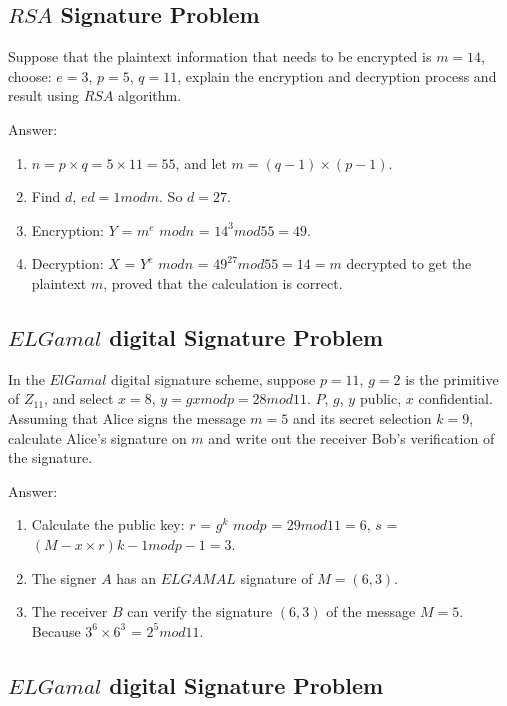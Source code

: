 \documentclass[paper=a4, fontsize=11pt]{scrartcl} %
\numberwithin{equation}{section} %
\numberwithin{figure}{section} %
\numberwithin{table}{section} %
\begin{document}
\subsection{$RSA$ Signature Problem \uppercase\expandafter{}}

Suppose that the plaintext information that needs to be encrypted is $m = 14$, choose: $e = 3$, $p = 5$, $q = 11$, explain the encryption and decryption process and result using $RSA$ algorithm.

Answer:
\begin{enumerate}
\item $n = p \times q = 5 \times 11 = 55$, and let $m = (q-1) \times (p-1)$.
\item Find $d$, $ed = 1 mod m$. So $d = 27$.
\item Encryption: $Y$ = $m ^ e$ $mod n$ = $14 ^ 3 mod 55 = 49$.
\item Decryption: $X$ = $Y ^ e$ $mod n$ = $49 ^ 27 mod 55 = 14 = m$ decrypted to get the plaintext $m$, proved that the calculation is correct.
\end{enumerate}


\subsection{$ELGamal$ digital Signature Problem \uppercase\expandafter{}}

In the $ElGamal$ digital signature scheme, suppose $p = 11$, $g = 2$ is the primitive of $Z$$_{11}$, and select $x = 8$, $y = gx mod p = 28 mod 11$. $P$, $g$, $y$ public, $x$ confidential. Assuming that Alice signs the message $m = 5$ and its secret selection $k = 9$, calculate Alice's signature on $m$ and write out the receiver Bob's verification of the signature.

Answer:
\begin{enumerate}
\item Calculate the public key: $r$ = $g ^ k$ $mod p$ = $29 mod 11 = 6$, $s$ = $(M-x \times r) k-1 mod p-1 =3$.
\item The signer $A$ has an $ELGAMAL$ signature of $M = (6,3)$.
\item The receiver $B$ can verify the signature $(6,3)$ of the message $M = 5$. Because $3^6 \times 6^3$ = $2^5 mod 11$.
\end{enumerate}


\subsection{$ELGamal$ digital Signature Problem \uppercase\expandafter{}}
\end{document}
